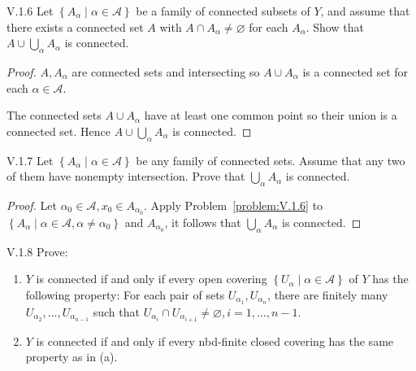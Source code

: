 \begin{problem}{V.1.6}\label{problem:V.1.6}
Let \( \left\{ A_{\alpha} \mid \alpha \in \mathscr{A} \right\} \) be a family of connected subsets of \( Y \), and assume that there exists a connected set \(A\) with \( A \cap A_{\alpha} \ne \varnothing \) for each \( A_{\alpha} \). Show that \( A \cup \bigcup_{\alpha} A_{\alpha} \) is connected.
\end{problem}

\begin{proof}
	\( A, A_{\alpha} \) are connected sets and intersecting so \( A \cup A_{\alpha} \) is a connected set for each \( \alpha \in \mathscr{A} \).

	The connected sets \( A \cup A_{\alpha} \) have at least one common point so their union is a connected set. Hence \( A \cup \bigcup_{\alpha} A_{\alpha} \) is connected.
\end{proof}

\begin{problem}{V.1.7}
Let \( \left\{ A_{\alpha} \mid \alpha \in \mathscr{A} \right\} \) be any family of connected sets. Assume that any two of them have nonempty intersection. Prove that \( \bigcup_{\alpha} A_{\alpha} \) is connected.
\end{problem}

\begin{proof}
	Let \( \alpha_{0} \in \mathscr{A}, x_{0} \in A_{\alpha_{0}} \). Apply Problem~\ref{problem:V.1.6} to \( \left\{ A_{\alpha} \mid \alpha \in \mathscr{A}, \alpha \ne \alpha_{0} \right\} \) and \( A_{\alpha_{0}} \), it follows that \( \bigcup_{\alpha} A_{\alpha} \) is connected.
\end{proof}

\begin{problem}{V.1.8}
Prove:
\begin{enumerate}[label={(\alph*)}]
	\item \(Y\) is connected if and only if every open covering \( \left\{ U_{\alpha} \mid \alpha \in \mathscr{A} \right\} \) of \(Y\) has the following property: For each pair of sets \( U_{\alpha_{1}}, U_{\alpha_{n}} \), there are finitely many \( U_{\alpha_{2}}, \ldots, U_{\alpha_{n-1}} \) such that \( U_{\alpha_{i}} \cap U_{\alpha_{i+1}} \ne \varnothing, i = 1, \ldots, n - 1 \).
	\item \(Y\) is connected if and only if every nbd-finite closed covering has the same property as in (a).
\end{enumerate}
\end{problem}

